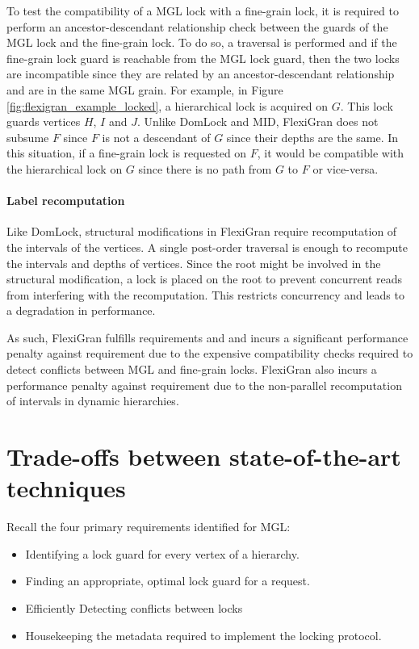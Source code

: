 To test the compatibility of a MGL lock with a fine-grain lock, it is required to perform an ancestor-descendant relationship check between the guards of the MGL lock and the fine-grain lock. To do so, a traversal is performed and if the fine-grain lock guard is reachable from the MGL lock guard, then the two locks are incompatible since they are related by an ancestor-descendant relationship and are in the same MGL grain. 
For example, in Figure \ref{fig:flexigran_example_locked}, a hierarchical lock is acquired on $G$. This lock guards vertices $H$, $I$ and $J$. Unlike DomLock and MID, FlexiGran does not subsume $F$ since $F$ is not a descendant of $G$ since their depths are the same. In this situation, if a fine-grain lock is requested on $F$, it would be compatible with the hierarchical lock on $G$ since there is no path from $G$ to $F$ or vice-versa.

\paragraph{Label recomputation}
Like DomLock, structural modifications in FlexiGran require recomputation of the intervals of the vertices. A single post-order traversal is enough to recompute the intervals and depths of vertices. Since the root might be involved in the structural modification, a lock is placed on the root to prevent concurrent reads from interfering with the recomputation. This restricts concurrency and leads to a degradation in performance. 

As such, FlexiGran fulfills requirements \Ra and \Rb and incurs a significant performance penalty against requirement \Rc due to the expensive compatibility checks required to detect conflicts between MGL and fine-grain locks. FlexiGran also incurs a performance penalty against requirement \Rd due to the non-parallel recomputation of intervals in dynamic hierarchies.



\section{Trade-offs between state-of-the-art techniques}

Recall the four primary requirements identified for MGL:
\begin{itemize}
    \item[\Ra] Identifying a lock guard for every vertex of a hierarchy.
    \item[\Rb] Finding an appropriate, optimal lock guard for a request.
    \item[\Rc] Efficiently Detecting conflicts between locks
    \item[\Rd] Housekeeping the metadata required to implement the locking protocol.
\end{itemize}

